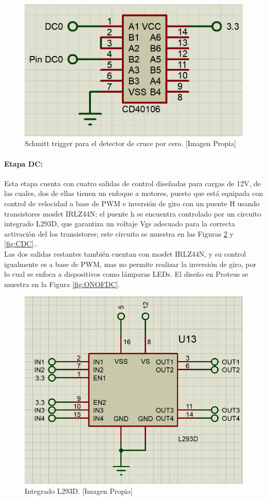 		\begin{figure}[H]
			\centering
			\caption[Schmitt trigger para el detector de cruce por cero.]{Schmitt trigger para el detector de cruce por cero. [Imagen Propia]}
			\label{fig:DC02}
			\includegraphics[width=0.5\linewidth]{Imagenes/DC02}
		\end{figure}
	
	\paragraph{Etapa DC:}
		Esta etapa cuenta con cuatro salidas de control diseñadas para cargas de 12V, de las cuales, dos de ellas tienen un enfoque a motores, puesto que está equipada con control de velocidad a base de PWM e inversión de giro con un puente H usando transistores mosfet IRLZ44N; el puente h se encuentra controlado por un circuito integrado L293D, que garantiza un voltaje Vgs adecuado para la correcta activación del los transistores; este circuito se muestra en las Figuras \ref{fig:L293D} y \ref{fig:CDC}.\cite{IRL}.\\
		
		Las dos salidas restantes también cuentan con mosfet IRLZ44N, y su control igualmente es a base de PWM, mas no permite realizar la inversión de giro, por lo cual se enfoca a dispositivos como lámparas LEDs. El diseño en Proteus se muestra en la Figura \ref{fig:ONOFDC}.\\
		
		\begin{figure}[H]
			\centering
			\caption[Integrado L293D.]{Integrado L293D. [Imagen Propia]}
			\label{fig:L293D}
			\includegraphics[width=0.5\linewidth]{Imagenes/L293D}
		\end{figure}
		
